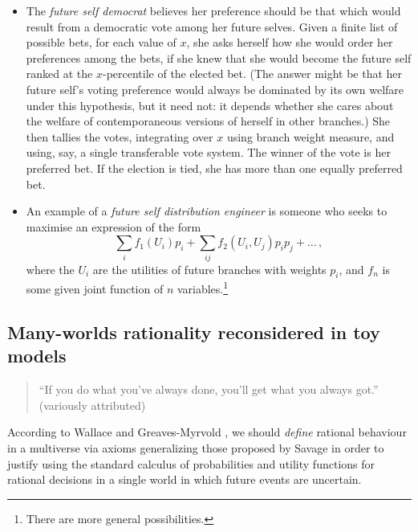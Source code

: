 \documentclass[aps,
pra,epsfig,12pt,nofootinbib]{revtex4}
\begin{document}
\begin{itemize}
\item The {\it future self democrat} believes her preference should
be that which would result from a democratic vote among her future
selves.   Given a finite list of possible bets, for each value of 
$x$, she asks herself how she would order her preferences 
among the bets, if she knew that she would become the future self ranked at 
the $x$-percentile of the elected bet.  
(The answer might be that her future self's voting preference would always be 
dominated by its own welfare under this hypothesis, but it need not: 
it depends whether she cares about the welfare 
of contemporaneous versions of herself in other branches.) 
She then tallies the votes, integrating over $x$ using branch weight
measure, and using, say, a single transferable vote system.  
The winner of the vote
is her preferred bet.   If the election is tied, she has  
more than one equally preferred bet.   

\item An example of a {\it future self distribution engineer} 
is someone who seeks to maximise an expression of the form
\begin{equation}
\sum_i f_1 (U_i ) p_i + \sum_{ij} f_2 (U_i , U_j ) p_i p_j + \ldots \, , 
\end{equation}
where the $U_i$ are the utilities of future branches with weights $p_i$, 
and $f_n$ is some given joint function of $n$ 
variables.\footnote{There are more general possibilities.}

\end{itemize}

\subsection{Many-worlds rationality reconsidered in toy models} 

\begin{quotation}
``If you do what you've always done, you'll get what you always got.'' (variously attributed)
\end{quotation}



According to Wallace \cite{wallacevoltwo} and 
Greaves-Myrvold \cite{greavesmyrvoldvol}, we should 
{\it define} rational behaviour in a multiverse via axioms 
generalizing those proposed by Savage \cite{savage} in order
to justify using the standard calculus of probabilities and
utility functions for rational decisions in a single world
in which future events are uncertain.   
\end{document}
